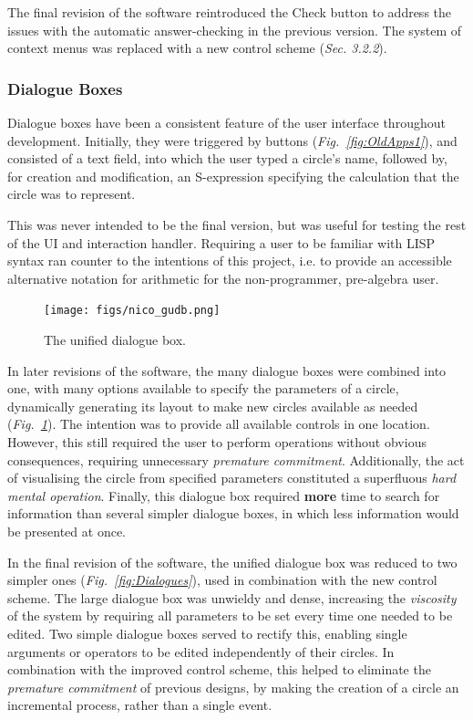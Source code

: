 \documentclass[12pt,twoside,notitlepage,xetex]{report}
\begin{document}
The final revision of the software reintroduced the {\sfapp Check} button to address the issues with the automatic answer-checking in the previous version.  The system of context menus was replaced with a new control scheme (\emph{Sec. 3.2.2}).

\subsubsection{Dialogue Boxes}

Dialogue boxes have been a consistent feature of the user interface throughout development.  Initially, they were triggered by buttons (\emph{Fig.~\ref{fig:OldApps1}}), and consisted of a text field, into which the user typed a circle's name, followed by, for creation and modification, an S-expression specifying the calculation that the circle was to represent.

This was never intended to be the final version, but was useful for testing the rest of the UI and interaction handler.  Requiring a user to be familiar with LISP syntax ran counter to the intentions of this project, i.e. to provide an accessible alternative notation for arithmetic for the non-programmer, pre-algebra user.

\begin{center}
\begin{figure}[H]
\begin{center}
\texttt{[image: figs/nico\_gudb.png]}
\end{center}
\caption{The unified dialogue box.}
\label{fig:GUDB}
\end{figure}
\end{center}

In later revisions of the software, the many dialogue boxes were combined into one, with many options available to specify the parameters of a circle, dynamically generating its layout to make new circles available as needed (\emph{Fig.~\ref{fig:GUDB}}).  The intention was to provide all available controls in one location.  However, this still required the user to perform operations without obvious consequences, requiring unnecessary \emph{premature commitment}.  Additionally, the act of visualising the circle from specified parameters constituted a superfluous \emph{hard mental operation}.  Finally, this dialogue box required {\bf more} time to search for information than several simpler dialogue boxes, in which less information would be presented at once.

In the final revision of the software, the unified dialogue box was reduced to two simpler ones (\emph{Fig.~\ref{fig:Dialogues}}), used in combination with the new control scheme.  The large dialogue box was unwieldy and dense, increasing the \emph{viscosity} of the system by requiring all parameters to be set every time one needed to be edited.  Two simple dialogue boxes served to rectify this, enabling single arguments or operators to be edited independently of their circles.  In combination with the improved control scheme, this helped to eliminate the \emph{premature commitment} of previous designs, by making the creation of a circle an incremental process, rather than a single event.
\end{document}
